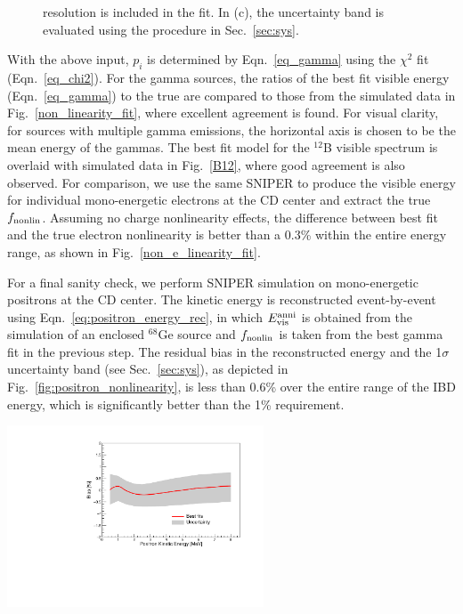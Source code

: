 \documentclass[a4paper,10pt,twoside]{cpc-hepnp}
\begin{document}
\begin{CJK*}{GB}{gbsn}
\begin{multicols}{2}
\begin{figure}[H]
{    resolution is included in the fit. In (c), the uncertainty band is
    evaluated using the procedure in Sec.~\ref{sec:sys}.  }
\end{figure}
With the above input, $p_i$ is determined by Eqn.~\ref{eq_gamma} using
the $\chi^2$ fit (Eqn.~\ref{eq_chi2}). For the gamma sources, the
ratios of the best fit visible energy (Eqn.~\ref{eq_gamma}) to the
true are compared to those from the simulated data in
Fig.~\ref{non_linearity_fit}, where excellent agreement is found. 
For visual clarity, 
for sources with multiple gamma emissions, the
horizontal axis is chosen to be the mean energy of the gammas.  The
best fit model for the $^{12}$B visible spectrum is overlaid with
simulated data in Fig.~\ref{B12}, where good agreement is also
observed.  For comparison, we use the same SNIPER to produce the
visible energy for individual mono-energetic electrons at the CD
center and extract the true $f_{\rm nonlin}$. 
Assuming no charge nonlinearity effects, the difference between
best fit and the true electron nonlinearity is better than a
0.3\% within the entire energy range, as shown in
Fig.~\ref{non_e_linearity_fit}.


For a final sanity check, we perform SNIPER simulation on
mono-energetic positrons at the CD center. The kinetic energy is
reconstructed event-by-event using Eqn.~\ref{eq:positron_energy_rec},
in which $E_{\rm vis}^{\rm anni}$ is obtained from the simulation of
an enclosed $^{68}$Ge source and $f_{\rm nonlin}$ is taken from the
best gamma fit in the previous step. The residual bias in the
reconstructed energy and the 1$\sigma$ uncertainty band (see
Sec.~\ref{sec:sys}), as depicted in
Fig.~\ref{fig:positron_nonlinearity}, is less than 0.6\% over the
entire range of the IBD energy, which is significantly better than the
1\% requirement.

\begin{center}
  \centering
  \includegraphics[width=3in]{non_eplus_bias.pdf}
  \label{fig:positron_nonlinearity}
\end{center}


\end{multicols}
\end{CJK*}
\end{document}
